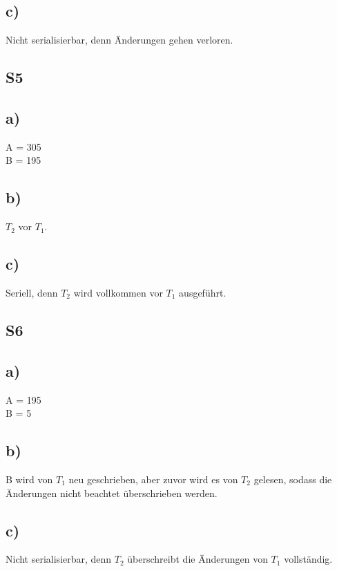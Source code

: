 \documentclass[a4paper,12pt,]{scrartcl}
\begin{document}
\subsection*{c)}
Nicht serialisierbar, denn Änderungen gehen verloren.

\subsection*{S5}
\subsection*{a)}
A = 305 \\
B = 195
\subsection*{b)}
\(T_2\) vor \(T_1\). 
\subsection*{c)}
Seriell, denn \(T_2\) wird vollkommen vor \(T_1\) ausgeführt. 

\subsection*{S6}
\subsection*{a)}
A = 195 \\
B = 5
\subsection*{b)}
B wird von \(T_1\) neu geschrieben, aber zuvor wird es von \(T_2\) gelesen, sodass die Änderungen nicht beachtet überschrieben werden.
\subsection*{c)}
Nicht serialisierbar, denn \(T_2\) überschreibt die Änderungen von \(T_1\) vollständig.
\end{document}
